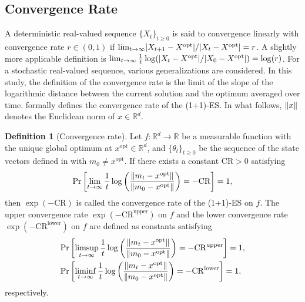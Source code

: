 \documentclass[journal]{IEEEtran}
\providecommand{\limsup}{\operatornamewithlimits{limsup}} %
\providecommand{\liminf}{\operatornamewithlimits{liminf}} %
\providecommand{\R}{\mathbb{R}} %
\renewcommand{\geq}{\geqslant} %
\DeclarePairedDelimiter{\norm}{\lVert}{\rVert}
\DeclarePairedDelimiter{\abs}{\lvert}{\rvert}
\theoremstyle{definition}
\newtheorem{definition}[]{Definition}
\begin{document}
\subsection{Convergence Rate}


A deterministic real-valued sequence $\{X_t\}_{t\geq 0}$ is said to convergence linearly with convergence rate $r \in (0, 1)$ if
$\lim_{t\to\infty} \abs*{X_{t+1} - X^\mathrm{opt}}/\abs*{X_t - X^\mathrm{opt}} = r$. A slightly more applicable definition is $\lim_{t\to\infty} \frac{1}{t}\log (\abs*{X_{t} - X^\mathrm{opt}} /\abs*{X_0 - X^\mathrm{opt}}) = \log(r)$.
For a stochastic real-valued sequence, various generalizations are considered. 
In this study, the definition of the convergence rate is the limit of the slope of the logarithmic distance between the current solution and the optimum averaged over time.
 formally defines the convergence rate of the (1+1)-ES.
In what follows, $\norm{x}$ denotes the Euclidean norm of $x \in \R^d$. 
\begin{definition}[Convergence rate]\label{def:convergence}
Let $f: \R^d \to \R$ be a measurable function with the unique global optimum at $x^\mathrm{opt}\in\R^d$, and $\{\theta_t\}_{t \geq 0}$ be the sequence of the state vectors defined in  with $m_0 \neq x^\mathrm{opt}$.
If there exists a constant $\mathrm{CR}>0$ satisfying
\begin{align}
\mathrm{Pr}\left[\lim_{t\rightarrow \infty} \frac{1}{t} \log \left( \frac{\norm{ m_t - x^\mathrm{opt} }}{\norm{m_0 - x^\mathrm{opt}}} \right) = -\mathrm{CR} \right] = 1
,
\end{align}
then $\exp(-\mathrm{CR})$ is called the convergence rate of the (1+1)-ES on $f$.
The upper convergence rate $\exp(-\mathrm{CR}^\mathrm{upper})$ on $f$ and the lower convergence rate $\exp(-\mathrm{CR}^\mathrm{lower})$ on $f$ are defined as constants satisfying
\begin{align}
&\mathrm{Pr}\left[\limsup_{t \to \infty} \frac{1}{t} \log \left( \frac{\norm{ m_t - x^\mathrm{opt} }}{\norm{m_0 - x^\mathrm{opt}}} \right) = -\mathrm{CR}^\mathrm{upper} \right] = 1
,
\\
&\mathrm{Pr}\left[\liminf_{t \to \infty} \frac{1}{t} \log \left( \frac{\norm{ m_t - x^\mathrm{opt} }}{\norm{m_0 - x^\mathrm{opt}}} \right) = -\mathrm{CR}^\mathrm{lower} \right] = 1
,
\end{align}
respectively.
\end{definition}
\end{document}
